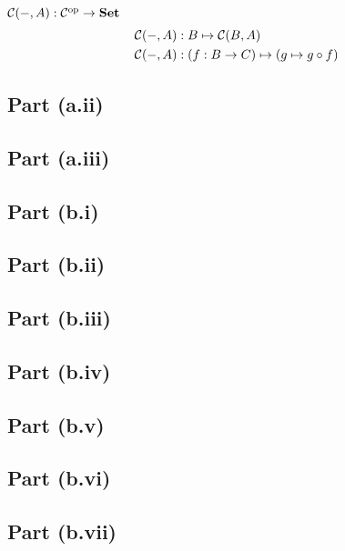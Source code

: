 \begin{definition}\label{def:contra-hom}
  $\mathcal{C}(-, A) : \mathcal{C}^{\text{op}} \to \mathbf{Set}$
  \begin{align*}
    \mathcal{C}(-, A) & : B \mapsto \mathcal{C}(B, A)\\
    \mathcal{C}(-, A) & : (f : B \to C) \mapsto (g \mapsto g \circ f)
  \end{align*}
\end{definition}

\subsection{Part (a.ii)}\label{sec:q-1-a-ii}
\subsection{Part (a.iii)}\label{sec:q-1-a-iii}
\subsection{Part (b.i)}\label{sec:q-1-b-i}
\subsection{Part (b.ii)}\label{sec:q-1-b-ii}
\subsection{Part (b.iii)}\label{sec:q-1-b-iii}
\subsection{Part (b.iv)}\label{sec:q-1-b-iv}
\subsection{Part (b.v)}\label{sec:q-1-b-v}
\subsection{Part (b.vi)}\label{sec:q-1-b-vi}
\subsection{Part (b.vii)}\label{sec:q-1-b-vii}
